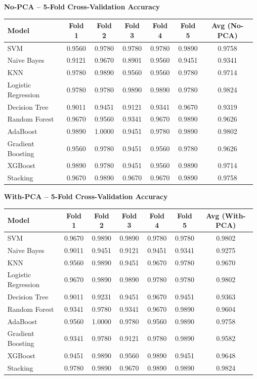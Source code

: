\documentclass[12pt,a4paper]{article}
\begin{document}
\textbf{No-PCA -- 5-Fold Cross-Validation Accuracy}
\begin{longtable}{lcccccc}
\toprule
Model & Fold 1 & Fold 2 & Fold 3 & Fold 4 & Fold 5 & Avg (No-PCA)\\
\midrule
SVM & 0.9560 & 0.9780 & 0.9780 & 0.9780 & 0.9890 & 0.9758\\
Naive Bayes & 0.9121 & 0.9670 & 0.8901 & 0.9560 & 0.9451 & 0.9341\\
KNN & 0.9780 & 0.9890 & 0.9560 & 0.9560 & 0.9780 & 0.9714\\
Logistic Regression & 0.9780 & 0.9780 & 0.9890 & 0.9890 & 0.9780 & 0.9824\\
Decision Tree & 0.9011 & 0.9451 & 0.9121 & 0.9341 & 0.9670 & 0.9319\\
Random Forest & 0.9670 & 0.9560 & 0.9341 & 0.9670 & 0.9890 & 0.9626\\
AdaBoost & 0.9890 & 1.0000 & 0.9451 & 0.9780 & 0.9890 & 0.9802\\
Gradient Boosting & 0.9560 & 0.9780 & 0.9451 & 0.9560 & 0.9780 & 0.9626\\
XGBoost & 0.9890 & 0.9780 & 0.9451 & 0.9560 & 0.9890 & 0.9714\\
Stacking & 0.9670 & 0.9890 & 0.9670 & 0.9670 & 0.9890 & 0.9758\\
\bottomrule
\end{longtable}

\textbf{With-PCA -- 5-Fold Cross-Validation Accuracy}
\begin{longtable}{lcccccc}
\toprule
Model & Fold 1 & Fold 2 & Fold 3 & Fold 4 & Fold 5 & Avg (With-PCA)\\
\midrule
SVM & 0.9670 & 0.9890 & 0.9890 & 0.9780 & 0.9780 & 0.9802\\
Naive Bayes & 0.9011 & 0.9451 & 0.9121 & 0.9451 & 0.9341 & 0.9275\\
KNN & 0.9560 & 0.9890 & 0.9451 & 0.9670 & 0.9780 & 0.9670\\
Logistic Regression & 0.9670 & 0.9890 & 0.9890 & 0.9780 & 0.9780 & 0.9802\\
Decision Tree & 0.9011 & 0.9231 & 0.9451 & 0.9670 & 0.9451 & 0.9363\\
Random Forest & 0.9341 & 0.9780 & 0.9341 & 0.9670 & 0.9890 & 0.9604\\
AdaBoost & 0.9560 & 1.0000 & 0.9780 & 0.9560 & 0.9890 & 0.9758\\
Gradient Boosting & 0.9341 & 0.9780 & 0.9121 & 0.9780 & 0.9890 & 0.9582\\
XGBoost & 0.9451 & 0.9890 & 0.9560 & 0.9890 & 0.9451 & 0.9648\\
Stacking & 0.9780 & 0.9890 & 0.9670 & 0.9890 & 0.9890 & 0.9824\\
\bottomrule
\end{longtable}
\end{document}
